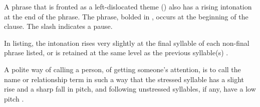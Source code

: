 A phrase that is fronted as a left-dislocated theme () also has a rising intonation at the end of the phrase.  The phrase, bolded in , occurs at the beginning of the clause.  The slash indicates a pause.

 

  
In listing, the intonation rises very slightly at the final syllable of each non-final phrase listed, or is retained at the same level as the previous syllable(s) .


 

A polite way of calling a person, of getting someone's attention, is to call the name or relationship term in such a way that the stressed syllable has a slight rise and a sharp fall in pitch, and following unstressed syllables, if any, have a low pitch .




